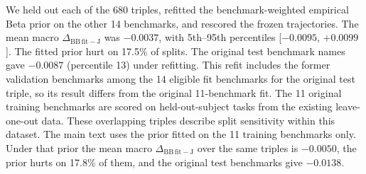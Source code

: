 We held out each of the 680 triples, refitted the benchmark-weighted empirical Beta prior on the other 14 benchmarks, and rescored the frozen trajectories. The mean macro $\Delta_{\mathrm{BB\,fit}-\mathrm{J}}$ was $\minus0.0037$, with 5th--95th percentiles [$\minus0.0095$, $+0.0099$]. The fitted prior hurt on 17.5\% of splits. The original test benchmark names gave $\minus0.0087$ (percentile 13) under refitting. This refit includes the former validation benchmarks among the 14 eligible fit benchmarks for the original test triple, so its result differs from the original 11-benchmark fit. The 11 original training benchmarks are scored on held-out-subject tasks from the existing leave-one-out data. These overlapping triples describe split sensitivity within this dataset. The main text uses the prior fitted on the 11 training benchmarks only. Under that prior the mean macro $\Delta_{\mathrm{BB\,fit}-\mathrm{J}}$ over the same triples is $\minus0.0050$, the prior hurts on 17.8\% of them, and the original test benchmarks give $\minus0.0138$.
